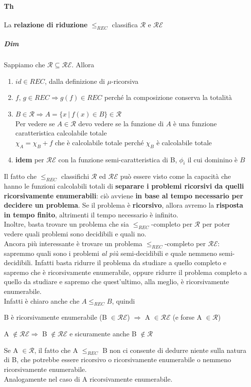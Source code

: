 \documentclass[10pt]{book}
\begin{document}
\paragraph{Th} La \textbf{relazione di riduzione} $\leq_{REC}$ classifica $\mathscr{R}$ e $\mathscr{RE}$
\subparagraph{Dim} Sappiamo che $\mathscr{R} \subseteq \mathscr{RE}$. Allora
\begin{enumerate}
	\item $id \in REC$, dalla definizione di $\mu$-ricorsiva
	\item $f$, $g \in REC \Rightarrow g(f) \in REC$ perché la composizione conserva la totalità
	\item $B \in \mathscr{R} \Rightarrow A = \{x \:|\: f(x) \in B\} \in \mathscr{R}$\\
	Per vedere se $A \in \mathscr{R}$ devo vedere se la funzione di $A$ è una funzione caratteristica calcolabile totale\\
	$\chi_A = \chi_B + f$ che è calcolabile totale perché $\chi_B$ è calcolabile totale
	\item \textbf{idem} per $\mathscr{RE}$ con la funzione semi-caratteristica di B, $\phi_i$ il cui dominino è $B$
\end{enumerate}
Il fatto che $\leq_{REC}$ classifichi $\mathscr{R}$ ed $\mathscr{RE}$ può essere visto come la capacità che hanno le funzioni calcolabili totali di \textbf{separare i problemi ricorsivi da quelli ricorsivamente enumerabili}: ciò avviene \textbf{in base al tempo necessario per decidere un problema}. Se il problema è \textbf{ricorsivo}, allora avremo la \textbf{risposta in tempo finito}, altrimenti il tempo necessario è infinito.\\
Inoltre, basta trovare un problema che sia $\leq_{REC}$-completo per $\mathscr{R}$ per poter vedere quali problemi sono decidibili e quali no.\\
Ancora più interessante è trovare un problema $\leq_{REC}$-completo per $\mathscr{RE}$: sapremmo quali sono i problemi \textit{al più} semi-decidibili e quale nemmeno semi-decidibili. Infatti basta ridurre il problema da studiare a quello completo e sapremo che è ricorsivamente enumerabile, oppure ridurre il problema completo a quello da studiare e sapremo che quest'ultimo, alla meglio, è ricorsivamente enumerabile.\\
Infatti è chiaro anche che $A \leq_{REC} B$, quindi
\begin{list}{}{}
	\item B è ricorsivamente enumerabile (B $\in \mathscr{RE}$) $\Rightarrow$ A $\in \mathscr{RE}$ (e forse A $\in \mathscr{R}$)
	\item A $\not\in\mathscr{RE} \Rightarrow$ B $\not\in\mathscr{RE}$ e sicuramente anche B $\not\in\mathscr{R}$
	\item Se A $\in\mathscr{R}$, il fatto che A $\leq_{REC}$ B non ci consente di dedurre niente sulla natura di B, che potrebbe essere ricorsivo o ricorsivamente enumerabile o nemmeno ricorsivamente enumerabile.\\
	Analogamente nel caso di A ricorsivamente enumerabile.
\end{list}
\end{document}
